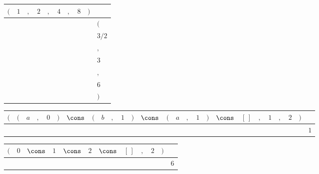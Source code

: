 {\scriptsize\setlength{\tabcolsep}{1.5pt}%
\begin{tabular}{ccccccccc|l}
$($ & $1$ & $,$ & $2$ & $,$ & $4$ & $,$ & $8$ & $)$ & \\ \hline
\gcell{$$} & \gcell{$$} & \gcell{$$} & \gcell{$$} & \gcell{$$} & \gcell{$$} & \gcell{$$} & \gcell{$$} & \gcell{$$} & $($ \\
\gcell{$$} & \gcell{$\posD{\bullet}$} & \gcell{$\posC{\circ}$} & \gcell{$\posD{\bullet}$} & \gcell{$\posC{\circ}$} & \gcell{$$} & \gcell{$$} & \gcell{$$} & \gcell{$$} & $3/2$ \\
\gcell{$$} & \gcell{$$} & \gcell{$$} & \gcell{$$} & \gcell{$$} & \gcell{$$} & \gcell{$$} & \gcell{$$} & \gcell{$$} & $,$ \\
\gcell{$$} & \gcell{$$} & \gcell{$\posC{\circ}$} & \gcell{$\posD{\bullet}$} & \gcell{$\posC{\circ}$} & \gcell{$\posD{\bullet}$} & \gcell{$\posC{\circ}$} & \gcell{$$} & \gcell{$$} & $3$ \\
\gcell{$$} & \gcell{$$} & \gcell{$$} & \gcell{$$} & \gcell{$$} & \gcell{$$} & \gcell{$$} & \gcell{$$} & \gcell{$$} & $,$ \\
\gcell{$$} & \gcell{$$} & \gcell{$\posC{\circ}$} & \gcell{$$} & \gcell{$\posC{\circ}$} & \gcell{$\posD{\bullet}$} & \gcell{$\posC{\circ}$} & \gcell{$\posD{\bullet}$} & \gcell{$$} & $6$ \\
\gcell{$$} & \gcell{$$} & \gcell{$$} & \gcell{$$} & \gcell{$$} & \gcell{$$} & \gcell{$$} & \gcell{$$} & \gcell{$$} & $)$ \\
\end{tabular}}
{\scriptsize\setlength{\tabcolsep}{1.5pt}%
\begin{tabular}{ccccccccccccccccccccccccc|l}
$($ & $($ & $a$ & $,$ & $0$ & $)$ & $\cons$ & $($ & $b$ & $,$ & $1$ & $)$ & $\cons$ & $($ & $a$ & $,$ & $1$ & $)$ & $\cons$ & $[\,]$ & $,$ & $1$ & $,$ & $2$ & $)$ & \\ \hline
\gcell{$$} & \gcell{$$} & \gcell{$\posC{\circ}$} & \gcell{$\posC{\circ}$} & \gcell{$\posD{\bullet}$} & \gcell{$$} & \gcell{$\posC{\circ}$} & \gcell{$$} & \gcell{$\posC{\circ}$} & \gcell{$\posC{\circ}$} & \gcell{$$} & \gcell{$$} & \gcell{$\posC{\circ}$} & \gcell{$$} & \gcell{$\posC{\circ}$} & \gcell{$\posC{\circ}$} & \gcell{$\posD{\bullet}$} & \gcell{$$} & \gcell{$\posC{\circ}$} & \gcell{$\posC{\circ}$} & \gcell{$\posC{\circ}$} & \gcell{$\posD{\bullet}$} & \gcell{$\posC{\circ}$} & \gcell{$$} & \gcell{$$} & $1$ \\
\end{tabular}}
{\scriptsize\setlength{\tabcolsep}{1.5pt}%
\begin{tabular}{ccccccccccc|l}
$($ & $0$ & $\cons$ & $1$ & $\cons$ & $2$ & $\cons$ & $[\,]$ & $,$ & $2$ & $)$ & \\ \hline
\gcell{$$} & \gcell{$\posD{\bullet}$} & \gcell{$\posC{\circ}$} & \gcell{$\posD{\bullet}$} & \gcell{$\posC{\circ}$} & \gcell{$\posD{\bullet}$} & \gcell{$\posC{\circ}$} & \gcell{$\posC{\circ}$} & \gcell{$\posC{\circ}$} & \gcell{$\posD{\bullet}$} & \gcell{$$} & $6$ \\
\end{tabular}}
